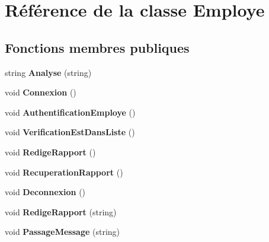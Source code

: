 \hypertarget{class_employe}{\section{Référence de la classe Employe}
\label{class_employe}
}
\subsection*{Fonctions membres publiques}
\begin{DoxyCompactItemize}
\item 
\hypertarget{class_employe_aefaf8b63319291c5d557583f62c234a9}{string {\bfseries Analyse} (string)}\label{class_employe_aefaf8b63319291c5d557583f62c234a9}

\item 
\hypertarget{class_employe_ab133ea7f87ed1fe42f84b9b733567722}{void {\bfseries Connexion} ()}\label{class_employe_ab133ea7f87ed1fe42f84b9b733567722}

\item 
\hypertarget{class_employe_aaef2ea495679ab80403b116e4618b4e8}{void {\bfseries Authentification\-Employe} ()}\label{class_employe_aaef2ea495679ab80403b116e4618b4e8}

\item 
\hypertarget{class_employe_af2c0ffa01a31c4fc7399f304609358af}{void {\bfseries Verification\-Est\-Dans\-Liste} ()}\label{class_employe_af2c0ffa01a31c4fc7399f304609358af}

\item 
\hypertarget{class_employe_a1334cc9524ed8018b3addb456e855d7c}{void {\bfseries Redige\-Rapport} ()}\label{class_employe_a1334cc9524ed8018b3addb456e855d7c}

\item 
\hypertarget{class_employe_ad9b36ebdafb48129b90c51f4f40d3e75}{void {\bfseries Recuperation\-Rapport} ()}\label{class_employe_ad9b36ebdafb48129b90c51f4f40d3e75}

\item 
\hypertarget{class_employe_a8c8fd0b2b74e124fd8df67660f0a5ae9}{void {\bfseries Deconnexion} ()}\label{class_employe_a8c8fd0b2b74e124fd8df67660f0a5ae9}

\item 
\hypertarget{class_employe_a9613d44ee61044ddd8b107f8d31bf18e}{void {\bfseries Redige\-Rapport} (string)}\label{class_employe_a9613d44ee61044ddd8b107f8d31bf18e}

\item 
\hypertarget{class_employe_afa2e71f67f5e1a0f86cf2b7004a46546}{void {\bfseries Passage\-Message} (string)}\label{class_employe_afa2e71f67f5e1a0f86cf2b7004a46546}

\end{DoxyCompactItemize}
